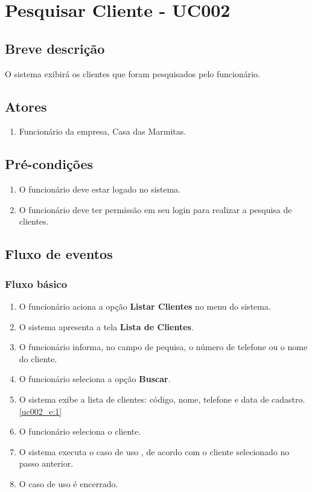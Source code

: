 \chapter{Pesquisar Cliente - UC002} \label{uc002}

\section{Breve descrição}

O sistema exibirá os clientes que foram pesquisados pelo funcionário.

\section{Atores}

\begin{enumerate}
	\item Funcionário da empresa, Casa das Marmitas.
\end{enumerate}

\section{Pré-condições}

\begin{enumerate}
	\item O funcionário deve estar logado no sistema.
	\item O funcionário deve ter permissão em seu login para realizar a pesquisa de clientes.
\end{enumerate}

\section{Fluxo de eventos}

\subsection{Fluxo básico}

\begin{enumerate}[label=P\arabic*]
	\item O funcionário aciona a opção \textbf{Listar Clientes} no menu do sistema.
	\item O sistema apresenta a tela \textbf{Lista de Clientes}. \label{uc002_p:2}	
	\item O funcionário informa, no campo de pequisa, o número de telefone ou o nome do cliente.
	\item O funcionário seleciona a opção \textbf{Buscar}.
	\item O sistema exibe a lista de clientes: código, nome, telefone e data de cadastro. \label{uc002_p:5}\ref{uc002_e:1}
	\item O funcionário seleciona o cliente.
	\item O sistema executa o caso de uso , de acordo com o cliente selecionado no passo anterior.
	\item O caso de uso é encerrado.
\end{enumerate}


